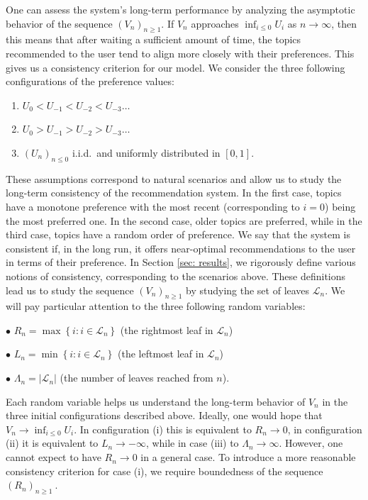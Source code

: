 \documentclass[12pt]{article}
\numberwithin{equation}{section} \font\titre=cmbx12
\newcommand{\Lset}{\mathcal{L}} %
\newcommand{\leftmost}{L}
\newcommand{\rightmost}{R}
\newcommand{\leaves}{\Lambda}
\begin{document}
One can assess the system's long-term performance by analyzing the asymptotic behavior of the sequence $(V_n)_{n\ge 1}$. If $V_n$ approaches $\inf_{i\le 0} U_i$ as $n\to \infty$, then this means that after waiting a sufficient amount of time, the topics recommended to the user tend to align more closely with their preferences. This gives us a consistency criterion for our model. 
We consider the three following configurations of the preference values: 

\begin{enumerate}%
    \item[(i)]  $U_0<U_{-1}<U_{-2}< U_{-3}\dots$
    \item[(ii)] $U_0>U_{-1}>U_{-2}> U_{-3}\dots$ 
    \item[(iii)] $(U_n)_{n\le 0}$ i.i.d.\ and uniformly distributed in $[0,1].$
\end{enumerate}

These assumptions correspond to natural scenarios and allow us to study the long-term consistency of the recommendation system.
In the first case, topics have a monotone preference with the most recent (corresponding to $i=0$) being the most preferred one.
In the second case, older topics are preferred, while in the third case, topics have a random order of preference. 
We say that the system is consistent if, in the long run, it offers near-optimal recommendations to the user in terms of their preference.
In Section \ref{sec: results}, we rigorously define various notions of consistency, corresponding to the scenarios above. 
These definitions lead us to study the sequence $(V_n)_{n\ge 1}$ by studying the set of leaves $\Lset_n$.
We will pay particular attention to the three following random variables:

\medskip

\noindent $\bullet$ $\rightmost_n=\max \left\{ i : i \in  \Lset_n \right\}$ (the rightmost leaf in $\Lset_n$)

\noindent $\bullet$ $\leftmost_n = \min \left\{ i : i \in  \Lset_n \right\}$ (the leftmost leaf in $\Lset_n$)

\noindent $\bullet$ $\leaves_n = |\Lset_n|$ (the number of leaves reached from $n$).

\medskip

Each random variable helps us understand the long-term behavior of $V_n$ in the three initial configurations described above. 
Ideally, one would hope that $V_n\to \inf_{i\le 0} U_i$.
In configuration (i)  this is equivalent to $\rightmost_n \to 0$, 
in configuration (ii) it is equivalent to $\leftmost_n\to -\infty$, while in case (iii) to $\leaves_n\to \infty$.
However, one cannot expect to have $\rightmost_n\to 0$ in a general case. 
To introduce a more reasonable consistency criterion for case (i), we require boundedness of the sequence $(\rightmost_n)_{n\ge 1}~.$
\end{document}
